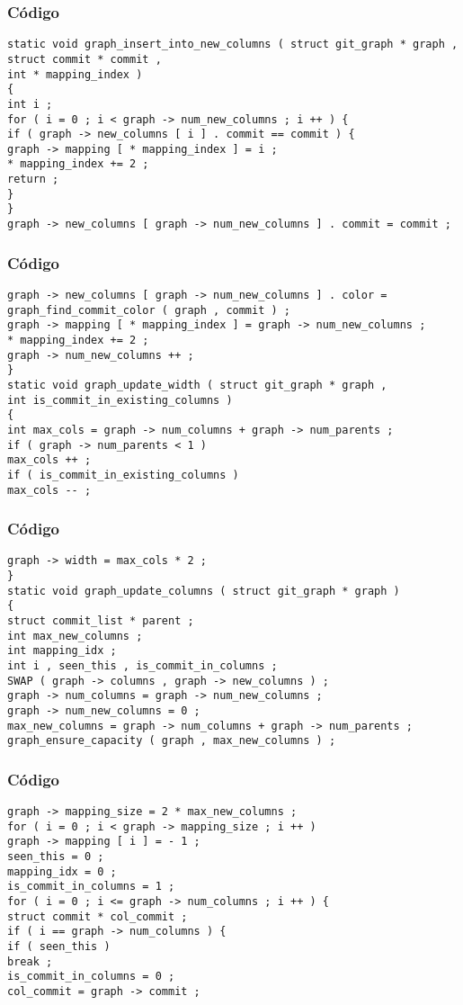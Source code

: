 \documentclass{beamer}
\begin{document}
\begin{frame}[fragile]
\frametitle{C\'odigo}
\begin{verbatim}
static void graph_insert_into_new_columns ( struct git_graph * graph , 
struct commit * commit , 
int * mapping_index ) 
{ 
int i ; 
for ( i = 0 ; i < graph -> num_new_columns ; i ++ ) { 
if ( graph -> new_columns [ i ] . commit == commit ) { 
graph -> mapping [ * mapping_index ] = i ; 
* mapping_index += 2 ; 
return ; 
} 
} 
graph -> new_columns [ graph -> num_new_columns ] . commit = commit ; 
\end{verbatim}
\end{frame}
\begin{frame}[fragile]
\frametitle{C\'odigo}
\begin{verbatim}
graph -> new_columns [ graph -> num_new_columns ] . color = graph_find_commit_color ( graph , commit ) ; 
graph -> mapping [ * mapping_index ] = graph -> num_new_columns ; 
* mapping_index += 2 ; 
graph -> num_new_columns ++ ; 
} 
static void graph_update_width ( struct git_graph * graph , 
int is_commit_in_existing_columns ) 
{ 
int max_cols = graph -> num_columns + graph -> num_parents ; 
if ( graph -> num_parents < 1 ) 
max_cols ++ ; 
if ( is_commit_in_existing_columns ) 
max_cols -- ; 
\end{verbatim}
\end{frame}
\begin{frame}[fragile]
\frametitle{C\'odigo}
\begin{verbatim}
graph -> width = max_cols * 2 ; 
} 
static void graph_update_columns ( struct git_graph * graph ) 
{ 
struct commit_list * parent ; 
int max_new_columns ; 
int mapping_idx ; 
int i , seen_this , is_commit_in_columns ; 
SWAP ( graph -> columns , graph -> new_columns ) ; 
graph -> num_columns = graph -> num_new_columns ; 
graph -> num_new_columns = 0 ; 
max_new_columns = graph -> num_columns + graph -> num_parents ; 
graph_ensure_capacity ( graph , max_new_columns ) ; 
\end{verbatim}
\end{frame}
\begin{frame}[fragile]
\frametitle{C\'odigo}
\begin{verbatim}
graph -> mapping_size = 2 * max_new_columns ; 
for ( i = 0 ; i < graph -> mapping_size ; i ++ ) 
graph -> mapping [ i ] = - 1 ; 
seen_this = 0 ; 
mapping_idx = 0 ; 
is_commit_in_columns = 1 ; 
for ( i = 0 ; i <= graph -> num_columns ; i ++ ) { 
struct commit * col_commit ; 
if ( i == graph -> num_columns ) { 
if ( seen_this ) 
break ; 
is_commit_in_columns = 0 ; 
col_commit = graph -> commit ; 
\end{verbatim}
\end{frame}
\end{document}

